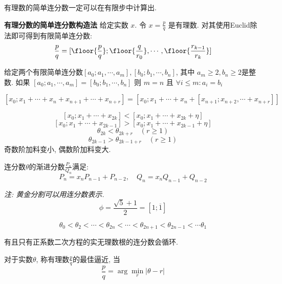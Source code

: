\begin{theorem}
    有理数的简单连分数一定可以在有限步中计算出.
\end{theorem}

\textbf{有理分数的简单连分数构造法} \hspace{1em} 给定实数 \(x\).
令 \(x = \frac{p}{q}\) 是有理数. 对其使用Euclid除法即可得到有限简单连分数:
\[\frac{p}{q} = [\floor{\frac{p}{q}};\floor{\frac{q}{r_0}},\cdots,\floor{\frac{r_{k-1}}{r_k}}]\]

\begin{theorem}[有限简单连分数的唯一性]
    给定两个有限简单连分数\([a_0;a_1,\cdots,a_m],[b_0;b_1,\cdots,b_n]\),
    其中 \(a_m \ge 2, b_n \ge 2\)是整数.
    如果 \([a_0;a_1,\cdots,a_m]=[b_0;b_1,\cdots,b_n]\)
    则 \(m = n\) 且 \(\forall i \le m: a_i = b_i\)
\end{theorem}

\begin{theorem}[连分数嵌套]
    \[[x_0;x_1+\cdots+x_n+x_{n+1}+\cdots+x_{n+r}] = 
    [x_0;x_1+\cdots+x_n+[x_{n+1};x_{n+2},\cdots+x_{n+r}]]\]
\end{theorem}

\begin{theorem}[加点料]
    \[[x_0;x_1+\cdots+x_{2k}] < [x_0;x_1+\cdots+x_{2k} + \eta]\]
    \[[x_0;x_1+\cdots+x_{2k-1}] > [x_0;x_1+\cdots+x_{2k-1} + \eta]\]
    \[\theta_{2k} < \theta_{2k+r} \quad (r \ge 1)\]
    \[\theta_{2k-1} > \theta_{2k-1+r} \quad (r \ge 1)\]
    奇数阶加料变小, 偶数阶加料变大.
\end{theorem}

\begin{theorem}[计算渐进分数]
    连分数\(\theta\)的渐进分数\(\frac{P_n}{Q_n}\)满足:
    \[P_n = x_n P_{n-1} + P_{n-2} ,\quad Q_n = x_n Q_{n-1} + Q_{n-2}\]
\end{theorem}

\textit{注: 黄金分割可以用连分数表示.}
\[\phi = \frac{\sqrt{5} + 1}{2} = [1;\overline{1}]\]

\begin{theorem}
    \[\theta_0 < \theta_2 < \cdots < \theta_{2n} < \cdots < \theta_{2n+1} < \theta_{2n-1} < \cdots \theta_1\]
\end{theorem}

\begin{theorem}[什么连分数会循环]
    有且只有正系数二次方程的实无理数根的连分数会循环.
\end{theorem}

\begin{theorem}[实数的最佳逼近]
    对于实数\(\theta\), 称有理数\(\frac{p}{q}\)的最佳逼近, 当
    \[\frac{p}{q} = \arg\min_r \left|\theta - r\right|\]
\end{theorem}